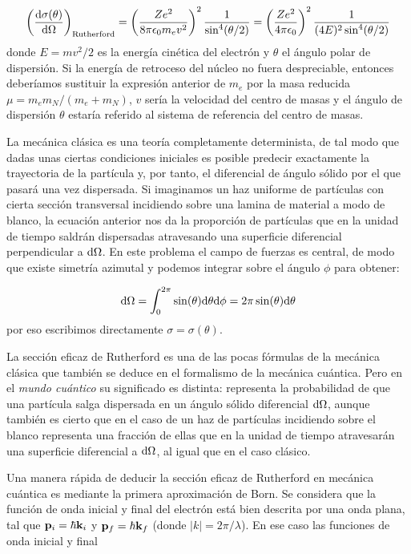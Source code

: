 \begin{equation}
	\left( \frac{\mathrm{d} \sigma(\theta)}{\mathrm{d} \Omega} \right)_{\text{Rutherford}} = \left( \frac{Ze^2}{8 \pi \epsilon_0 m_e v^2} \right)^2 \frac{1}{\sin^4 (\theta/2)} = \left( \frac{Ze^2}{ 4 \pi \epsilon_0} \right)^2 \frac{1}{(4E)^2\sin^4 (\theta/2)}
\end{equation}
donde $E=mv^2/2$ es la energía cinética del electrón y $\theta$ el ángulo polar de dispersión. Si la energía de retroceso del núcleo no fuera despreciable, entonces deberíamos sustituir la expresión anterior de $m_e$ por la masa reducida $\mu=m_em_N / (m_e+m_N)$, $v$ sería la velocidad del centro de masas y el ángulo de dispersión $\theta$ estaría referido al sistema de referencia del centro de masas.

La mecánica clásica es una teoría completamente determinista, de tal modo que dadas unas ciertas condiciones iniciales es posible predecir exactamente la trayectoria de la partícula y, por tanto, el diferencial de ángulo sólido por el que pasará una vez dispersada. Si imaginamos un haz uniforme de partículas con cierta sección transversal incidiendo sobre una lamina de material a modo de blanco, la ecuación anterior nos da la proporción de partículas que en la unidad de tiempo saldrán dispersadas atravesando una superficie diferencial perpendicular a $\mathrm{d} \Omega$. En este problema el campo de fuerzas es central, de modo que existe simetría azimutal y podemos integrar sobre el ángulo $\phi$ para obtener:

\begin{equation}
	\mathrm{d} \Omega = \int_0^{2\pi} \sin (\theta) \mathrm{d} \theta \mathrm{d} \phi = 2 \pi \sin (\theta) \mathrm{d} \theta
\end{equation}
por eso escribimos directamente $\sigma = \sigma (\theta)$.

La sección eficaz de Rutherford es una de las pocas fórmulas de la mecánica clásica que también se deduce en el formalismo de la mecánica cuántica. Pero en el \textit{mundo cuántico} su significado es distinta: representa la probabilidad de que una partícula salga dispersada en un ángulo sólido diferencial $\mathrm{d} \Omega$, aunque también es cierto que en el caso de un haz de partículas incidiendo sobre el blanco representa una fracción de ellas que en la unidad de tiempo atravesarán una superficie diferencial a $\mathrm{d} \Omega$, al igual que en el caso clásico.

Una manera rápida de deducir la sección eficaz de Rutherford en mecánica cuántica es mediante la primera aproximación de Born. Se considera que la función de onda inicial y final del electrón está bien descrita por una onda plana, tal que $\mathbf{p}_i=\hbar \mathbf{k}_i$ y $\mathbf{p}_f = \hbar \mathbf{k}_f$ (donde $|k|=2\pi / \lambda$).  En ese caso las funciones de onda inicial y final

